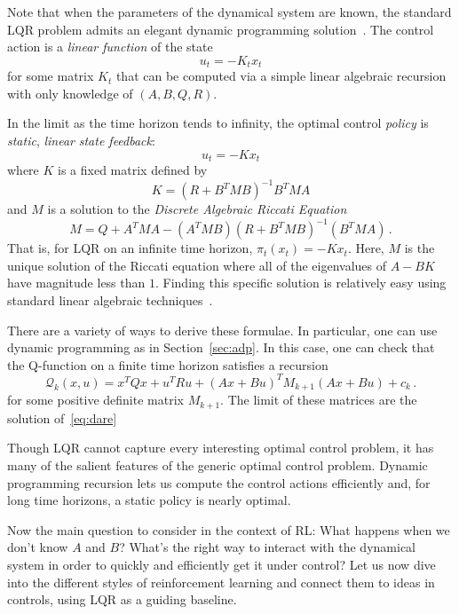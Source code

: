 \documentclass[11pt]{article}
\newcommand{\eq}[1]{\eqref{eq:#1}}
\numberwithin{equation}{section}
\begin{document}
Note that when the parameters of the dynamical system are known, the standard LQR problem admits an elegant dynamic programming solution~\cite{Zhou95}. The control action is a \emph{linear function} of the state
\begin{equation*}
	u_t = -K_t x_t
\end{equation*}
for some matrix $K_t$ that can be computed via a simple linear algebraic recursion with only knowledge of $(A,B,Q,R)$.

In the limit as the time horizon tends to infinity, the optimal control \emph{policy} is \emph{static}, \emph{linear} \emph{state feedback}:
\begin{equation*}
	u_t = -K x_t
\end{equation*}
where $K$ is a fixed matrix defined by
\begin{equation*}
	K=(R + B^T M B)^{-1} B^T M A
\end{equation*}
and $M$ is a solution to the \emph{Discrete Algebraic Riccati Equation}
\begin{equation}\label{eq:dare}
M = Q + A^T M A - (A^T M B)(R + B^T M B)^{-1} (B^T M A)\,.
\end{equation}
That is, for LQR on an infinite time horizon, $\pi_t (x_t) = - K x_t$. Here, $M$ is the unique solution of the Riccati equation where
all of the eigenvalues of $A-BK$ have magnitude less than $1$. Finding this specific solution
is relatively easy using standard linear algebraic techniques~\cite{Zhou95}.

There are a variety of ways to derive these formulae. In particular, one can use dynamic programming as in Section~\ref{sec:adp}. In this case, one can check that the Q-function on a finite time horizon satisfies a recursion
\begin{equation*}
 \mathcal{Q}_k(x,u) = x^T Q x + u^T R u + (Ax+Bu)^T M_{k+1} (Ax+Bu) + c_k\,.
\end{equation*}
for some positive definite matrix $M_{k+1}$. The limit of these matrices are the solution of~\eq{dare}

Though LQR cannot capture every interesting optimal control problem, it has many of the salient features of the generic optimal control problem. Dynamic programming recursion lets us compute the control actions efficiently and, for long time horizons, a static policy is nearly optimal.

Now the main question to consider in the context of RL: What happens when we don't know $A$ and $B$? What's the right way to interact with the dynamical system in order to quickly and efficiently get it under control? Let us now dive into the different styles of reinforcement learning and connect them to ideas in controls, using LQR as a guiding baseline.
\end{document}
